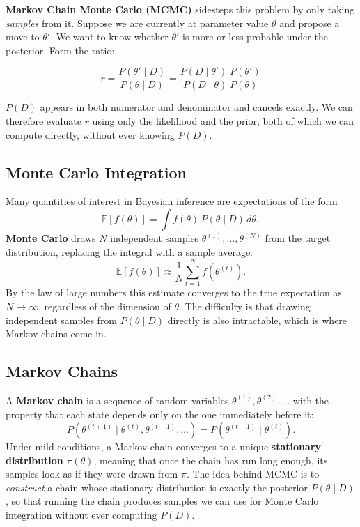 \documentclass[12pt, a4paper]{article}
\begin{document}
\textbf{Markov Chain Monte Carlo (MCMC)} sidesteps this problem by only taking
\textit{samples} from it. Suppose we are currently at parameter value $\theta$ and propose
a move to $\theta'$. We want to know whether $\theta'$ is more or
less probable under the posterior. Form the ratio:

\begin{equation}
    r = \frac{P(\theta' \mid D)}{P(\theta \mid D)}
      = \frac{P(D \mid \theta') \; P(\theta')}{P(D \mid \theta) \; P(\theta)}
    \label{eq:ratio}
\end{equation}

$P(D)$ appears in both numerator and denominator and cancels
exactly. We can therefore evaluate $r$ using only the likelihood
and the prior, both of which we can compute directly,
without ever knowing $P(D)$.

\subsection{Monte Carlo Integration}

Many quantities of interest in Bayesian inference are expectations
of the form
\[
    \mathbb{E}[f(\theta)] = \int f(\theta)\, P(\theta \mid D)\, d\theta,
\]
\textbf{Monte Carlo} draws $N$ independent
samples $\theta^{(1)}, \ldots, \theta^{(N)}$ from the target
distribution, replacing the integral with a sample average:
\[
    \mathbb{E}[f(\theta)] \approx \frac{1}{N} \sum_{t=1}^{N} f\!\left(\theta^{(t)}\right).
\]
By the law of large numbers this estimate converges to the true
expectation as $N \to \infty$, regardless of the dimension of
$\theta$. The difficulty is that drawing independent samples from
$P(\theta \mid D)$ directly is also intractable, which is
where Markov chains come in.

\subsection{Markov Chains}

A \textbf{Markov chain} is a sequence of random variables
$\theta^{(1)}, \theta^{(2)}, \ldots$ with the property that each
state depends only on the one immediately before it:
\[
    P\!\left(\theta^{(t+1)} \mid \theta^{(t)}, \theta^{(t-1)}, \ldots\right)
    = P\!\left(\theta^{(t+1)} \mid \theta^{(t)}\right).
\]
Under mild conditions, a Markov chain converges to a unique
\textbf{stationary distribution} $\pi(\theta)$, meaning that once
the chain has run long enough, its samples look as if they were
drawn from $\pi$. The idea behind MCMC is to \textit{construct} a
chain whose stationary distribution is exactly the posterior
$P(\theta \mid D)$, so that running the chain produces samples we
can use for Monte Carlo integration without ever computing
$P(D)$.
\end{document}
